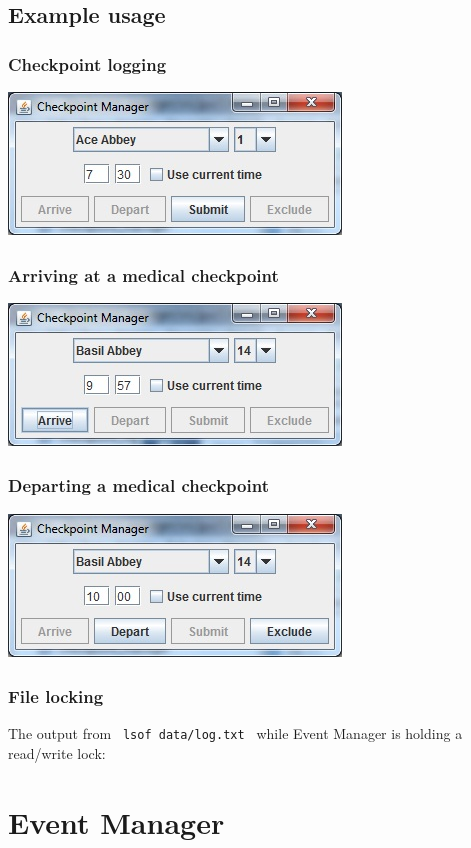 \documentclass[a4paper, twoside]{article}
\begin{document}
\subsection{Example usage}
\subsubsection{Checkpoint logging}
\includegraphics{screenshot1.jpg}
\subsubsection{Arriving at a medical checkpoint}
\includegraphics{screenshot2.jpg}
\subsubsection{Departing a medical checkpoint}
\includegraphics{screenshot3.jpg}
\subsubsection{File locking}
The output from \verb+ lsof data/log.txt + while Event Manager is holding a
read/write lock:


\section{Event Manager}
\end{document}
